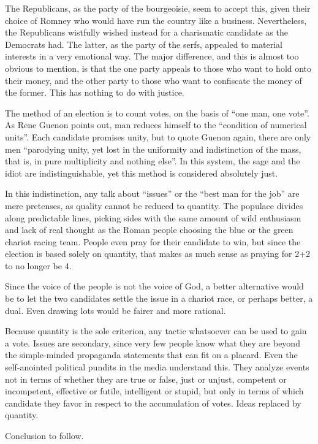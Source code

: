 The Republicans, as the party of the bourgeoisie, seem to accept this, given their choice of Romney who would have run the country like a business. Nevertheless, the Republicans wistfully wished instead for a charismatic candidate as the Democrats had. The latter, as the party of the serfs, appealed to material interests in a very emotional way. The major difference, and this is almost too obvious to mention, is that the one party appeals to those who want to hold onto their money, and the other party to those who want to confiscate the money of the former. This has nothing to do with justice.

The method of an election is to count votes, on the basis of ``one man, one vote''. As Rene Guenon points out, man reduces himself to the ``condition of numerical units''. Each candidate promises unity, but to quote Guenon again, there are only men ``parodying unity, yet lost in the uniformity and indistinction of the mass, that is, in pure multiplicity and nothing else''. In this system, the sage and the idiot are indistinguishable, yet this method is considered absolutely just.

In this indistinction, any talk about ``issues'' or the ``best man for the job'' are mere pretenses, as quality cannot be reduced to quantity. The populace divides along predictable lines, picking sides with the same amount of wild enthusiasm and lack of real thought as the Roman people choosing the blue or the green chariot racing team. People even pray for their candidate to win, but since the election is based solely on quantity, that makes as much sense as praying for 2+2 to no longer be 4.

Since the voice of the people is not the voice of God, a better alternative would be to let the two candidates settle the issue in a chariot race, or perhaps better, a dual. Even drawing lots would be fairer and more rational.

Because quantity is the sole criterion, any tactic whatsoever can be used to gain a vote. Issues are secondary, since very few people know what they are beyond the simple-minded propaganda statements that can fit on a placard. Even the self-anointed political pundits in the media understand this. They analyze events not in terms of whether they are true or false, just or unjust, competent or incompetent, effective or futile, intelligent or stupid, but only in terms of which candidate they favor in respect to the accumulation of votes. Ideas replaced by quantity.

Conclusion to follow.



